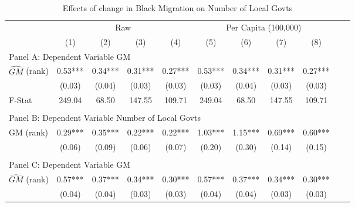  \begin{table}[htbp]\centering {} \begin{threeparttable} \caption{Effects of change in Black Migration on Number of Local Govts} \begin{tabular}{l*{10}{c}} \toprule
                &\multicolumn{4}{c}{Raw}                                    &\multicolumn{4}{c}{Per Capita (100,000)}                   \\\cmidrule(lr){2-5}\cmidrule(lr){6-9}
                &\multicolumn{1}{c}{(1)}   &\multicolumn{1}{c}{(2)}   &\multicolumn{1}{c}{(3)}   &\multicolumn{1}{c}{(4)}   &\multicolumn{1}{c}{(5)}   &\multicolumn{1}{c}{(6)}   &\multicolumn{1}{c}{(7)}   &\multicolumn{1}{c}{(8)}   \\
\cmidrule(lr){1-9}
\multicolumn{8}{l}{Panel A: Dependent Variable GM}\\
\cmidrule(lr){1-9}
$\hat{GM}$ (rank)&       0.53***&       0.34***&       0.31***&       0.27***&       0.53***&       0.34***&       0.31***&       0.27***\\
                &     (0.03)   &     (0.04)   &     (0.03)   &     (0.03)   &     (0.03)   &     (0.04)   &     (0.03)   &     (0.03)   \\
\midrule
F-Stat          &     249.04   &      68.50   &     147.55   &     109.71   &     249.04   &      68.50   &     147.55   &     109.71   \\
\cmidrule[\heavyrulewidth](lr){1-9} \\ \cmidrule[\heavyrulewidth](lr){1-9}
\multicolumn{8}{l}{Panel B: Dependent Variable Number of Local Govts}\\
\cmidrule(lr){1-9}
GM  (rank)      &       0.29***&       0.35***&       0.22***&       0.22***&       1.03***&       1.15***&       0.69***&       0.60***\\
                &     (0.06)   &     (0.09)   &     (0.06)   &     (0.07)   &     (0.20)   &     (0.30)   &     (0.14)   &     (0.15)   \\
\cmidrule[\heavyrulewidth](lr){1-9} \\ \cmidrule[\heavyrulewidth](lr){1-9}
\multicolumn{8}{l}{Panel C: Dependent Variable GM}\\
\cmidrule(lr){1-9}
$\hat{GM}$ (rank)&       0.57***&       0.37***&       0.34***&       0.30***&       0.57***&       0.37***&       0.34***&       0.30***\\
                &     (0.04)   &     (0.04)   &     (0.03)   &     (0.03)   &     (0.04)   &     (0.04)   &     (0.03)   &     (0.03)   \\

\end{tabular}
\end{threeparttable}
\end{table}
